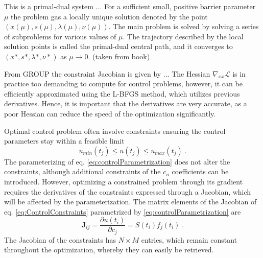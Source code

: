 This is a primal-dual system ...
For a sufficient small, positive barrier parameter $\mu$ the problem gas a locally unique solution denoted by the point $( x(\mu) , s (\mu) , \lambda (\mu) , \nu (\mu) )$. The main problem is solved by solving a series of subproblems for various values of $\mu$. The trajectory described by the local solution points is called the primal-dual central path, and it converges to $( x* , s* , \lambda* , \nu * )$ as $\mu \to 0$. (taken from book)

From GROUP the constraint Jacobian is given by ...
The Hessian $\nabla_{xx} \mathcal{L}$ is in practice too demanding to compute for control problems, however, it can be efficiently approximated using the L-BFGS method, which utilizes previous derivatives. Hence, it is important that the derivatives are very accurate, as a poor Hessian can reduce the speed of the optimization significantly. 

Optimal control problem often involve constraints ensuring the control parameters stay within a feasible limit
\begin{equation}
	 u_{min} (t_j) \leq u(t_j) \leq u_{max} (t_j) \; .
	 \label{eq:ControlConstraints}
\end{equation}
The parameterizing of eq. \eqref{eq:controlParametrization} does not alter the constraints, although additional constraints of the $c_n$ coefficients can be introduced. However, optimizing a constrained problem through its gradient requires the derivatives of the constraints expressed through a Jacobian, which will be affected by the parameterization. The matrix elements of the Jacobian of eq. \eqref{eq:ControlConstraints} parametrized by \eqref{eq:controlParametrization} are
\begin{equation}
	\boldsymbol{J}_{ij} = \frac{\partial u(t_i)}{\partial c_j} = S(t_i) f_j (t_i) \; . \label{eq:ConstraintJacobian}
\end{equation}
The Jacobian of the constraints has $N \times M$ entries, which remain constant throughout the optimization, whereby they can easily be retrieved.
